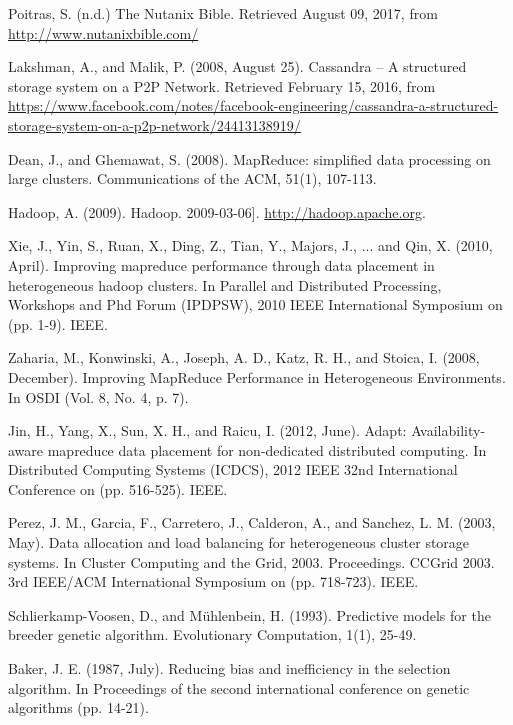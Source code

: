 \documentclass[12pt]{article}
\begin{document}
 \begin{thebibliography}{99}

    Poitras, S. (n.d.) The Nutanix Bible. Retrieved August 09, 2017, from \url{http://www.nutanixbible.com/}

    Lakshman, A., and Malik, P. (2008, August 25). Cassandra – A structured storage system on a P2P Network. Retrieved February 15, 2016, from \url{https://www.facebook.com/notes/facebook-engineering/cassandra-a-structured-storage-system-on-a-p2p-network/24413138919/}

    Dean, J., and Ghemawat, S. (2008). MapReduce: simplified data processing on large clusters. Communications of the ACM, 51(1), 107-113.

    Hadoop, A. (2009). Hadoop. 2009-03-06].  \url{http://hadoop.apache.org}.

    Xie, J., Yin, S., Ruan, X., Ding, Z., Tian, Y., Majors, J., ... and Qin, X. (2010, April). Improving mapreduce performance through data placement in heterogeneous hadoop clusters. In Parallel and Distributed Processing, Workshops and Phd Forum (IPDPSW), 2010 IEEE International Symposium on (pp. 1-9). IEEE.

    Zaharia, M., Konwinski, A., Joseph, A. D., Katz, R.  H., and Stoica, I. (2008, December). Improving MapReduce Performance in Heterogeneous Environments. In OSDI (Vol. 8, No. 4, p. 7).

    Jin, H., Yang, X., Sun, X. H., and Raicu, I. (2012, June). Adapt: Availability-aware mapreduce data placement for non-dedicated distributed computing. In Distributed Computing Systems (ICDCS), 2012 IEEE 32nd International Conference on (pp. 516-525). IEEE.

    Perez, J. M., Garcia, F., Carretero, J., Calderon, A., and Sanchez, L. M. (2003, May). Data allocation and load balancing for heterogeneous cluster storage systems. In Cluster Computing and the Grid, 2003. Proceedings. CCGrid 2003. 3rd IEEE/ACM International Symposium on (pp. 718-723). IEEE.

    Schlierkamp-Voosen, D., and Mühlenbein, H. (1993). Predictive models for the breeder genetic algorithm. Evolutionary Computation, 1(1), 25-49.

    Baker, J. E. (1987, July). Reducing bias and inefficiency in the selection algorithm. In Proceedings of the second international conference on genetic algorithms (pp. 14-21).


\end{thebibliography}
\end{document}
